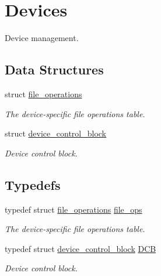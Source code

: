 \hypertarget{group__dev}{}\section{Devices}
\label{group__dev}


Device management.  


\subsection*{Data Structures}
\begin{DoxyCompactItemize}
\item 
struct \hyperlink{structfile__operations}{file\+\_\+operations}
\begin{DoxyCompactList}\small\item\em The device-\/specific file operations table. \end{DoxyCompactList}\item 
struct \hyperlink{structdevice__control__block}{device\+\_\+control\+\_\+block}
\begin{DoxyCompactList}\small\item\em Device control block. \end{DoxyCompactList}\end{DoxyCompactItemize}
\subsection*{Typedefs}
\begin{DoxyCompactItemize}
\item 
typedef struct \hyperlink{structfile__operations}{file\+\_\+operations} \hyperlink{group__dev_gaab625d8ae3a95e942ed10ed1579f5042}{file\+\_\+ops}
\begin{DoxyCompactList}\small\item\em The device-\/specific file operations table. \end{DoxyCompactList}\item 
typedef struct \hyperlink{structdevice__control__block}{device\+\_\+control\+\_\+block} \hyperlink{group__dev_gaf0e2d4a982667466d84f6fb7522611d6}{D\+CB}
\begin{DoxyCompactList}\small\item\em Device control block. \end{DoxyCompactList}\end{DoxyCompactItemize}
